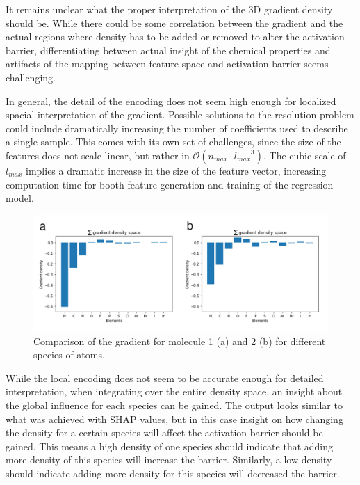It remains unclear what the proper interpretation of the 3D gradient density should be.
While there could be some correlation between the gradient and the actual regions where density has to be added or
removed to alter the activation barrier, differentiating between actual insight of the chemical properties and artifacts 
of the mapping between feature space and activation barrier seems challenging.

In general, the detail of the encoding does not seem high enough for localized spacial interpretation of the gradient.
Possible solutions to the resolution problem could include dramatically increasing the number of coefficients used to describe a single sample.
This comes with its own set of challenges, since the size of the features does not scale linear, but rather in $\mathcal{O}(n_{max} \cdot {l_{max}}^3)$.
The cubic scale of $l_{max}$ implies a dramatic increase in the size of the feature vector, increasing computation time for booth feature generation and training of the regression model.
\\

\begin{figure}[H]
  \includegraphics[width=1.0\textwidth]{figures/evaluation/gradient-comp.png}
  \caption[Comparison of summed gradients]{
    Comparison of the gradient for molecule 1 (a) and 2 (b) for different species of atoms.
  }
  \label{fig:snap_global_gradient}

\end{figure}

While the local encoding does not seem to be accurate enough for detailed interpretation,
when integrating over the entire density space, an insight about the global influence for each species can be gained.
The output looks similar to what was achieved with SHAP values, but in this case insight on how changing the density for a certain species will affect the activation barrier should be gained.
This means a high density of one species should indicate that adding more density of this species will increase the barrier.
Similarly, a low density should indicate adding more density for this species will decreased the barrier. %

